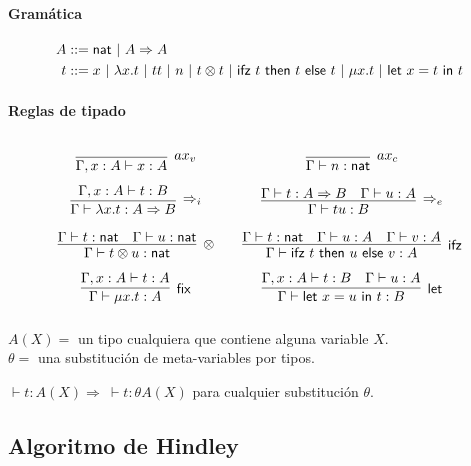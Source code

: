\documentclass[twoside,a4paper,12pt]{article}
\theoremstyle{definition}
\theoremstyle{remark}
\begin{document}
\paragraph{Gramática}
\begin{align*}
  A &::= \mathsf{nat}~|~A\Rightarrow A\\
  t &::= x~|~\lambda {x}{.}{t}~|~tt~|~n~|~t\otimes t~|~\mathsf{ifz~}t\mathsf{~then~}t\mathsf{~else~}t~|~\mathsf{\mu}x.t~|~\mathsf{let~}x=t\mathsf{~in~}t
\end{align*}

\paragraph{Reglas de tipado}
\[\arraycolsep=10pt\def\arraystretch{2.6}
  \begin{array}{cc}
    \infer[ax_v]{\Gamma,x:A\vdash x:A}{} &
    \infer[ax_c]{\Gamma\vdash n:\nat}{} \\
    \infer[\Rightarrow_i]
      {\Gamma\vdash\fun xt:A\Rightarrow B}
      {\Gamma,x:A\vdash t:B} &
    \infer[\Rightarrow_e]
      {\Gamma\vdash tu:B}
      {\Gamma\vdash t:A\Rightarrow B & \Gamma\vdash u:A} \\
    \infer[\otimes]
      {\Gamma\vdash t\otimes u:\nat}
      {\Gamma\vdash t:\nat & \Gamma\vdash u:\nat} &
    \infer[\mathsf{ifz}]
      {\Gamma\vdash\ifz tuv:A}
      {\Gamma\vdash t:\nat & \Gamma\vdash u:A & \Gamma\vdash v:A} \\
    \infer[\mathsf{fix}]
      {\Gamma\vdash\fix xt:A}
      {\Gamma,x:A\vdash t:A} &
    \infer[\mathsf{let}]
      {\Gamma\vdash\letl xut:B}
      {\Gamma,x:A\vdash t:B & \Gamma\vdash u:A}
  \end{array}
\]

\begin{definicion}{5.1}
  $A(X) = $ un tipo cualquiera que contiene alguna variable $X$. \\
  $\theta = $ una substitución de meta-variables por tipos.
\end{definicion}

\begin{teorema}{5.3}
  $\vdash t:A(X) \Rightarrow \ \vdash t:\theta A(X)$ para cualquier
  substitución $\theta$.
\end{teorema}

\clearpage
\subsection*{Algoritmo de Hindley}
\end{document}
